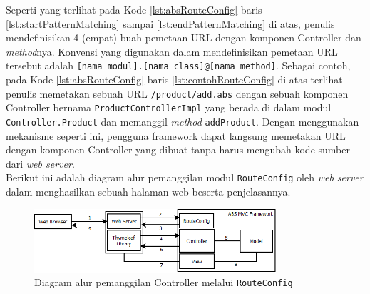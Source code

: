 Seperti yang terlihat pada Kode \ref{lst:absRouteConfig} baris \ref{lst:startPatternMatching} sampai \ref{lst:endPatternMatching} di atas, penulis mendefinisikan 4 (empat) buah pemetaan URL dengan komponen Controller dan \textit{method}nya. Konvensi yang digunakan dalam mendefinisikan pemetaan URL tersebut adalah \texttt{[nama modul].[nama class]@[nama method]}. Sebagai contoh, pada Kode \ref{lst:absRouteConfig} baris \ref{lst:contohRouteConfig} di atas terlihat penulis memetakan sebuah URL \texttt{/product/add.abs} dengan sebuah komponen Controller bernama \texttt{ProductControllerImpl} yang berada di dalam modul \texttt{Controller.Product} dan memanggil \textit{method} \texttt{addProduct}. Dengan menggunakan mekanisme seperti ini, pengguna framework dapat langsung memetakan URL dengan komponen Controller yang dibuat tanpa harus mengubah kode sumber dari \textit{web server}.\\

Berikut ini adalah diagram alur pemanggilan modul \texttt{RouteConfig} oleh \textit{web server} dalam menghasilkan sebuah halaman web beserta penjelasannya.

\begin{figure}
    \centering
    \includegraphics[width=0.8\textwidth]{img/absmvc_flow.png}
    \caption{Diagram alur pemanggilan Controller melalui \texttt{RouteConfig}}
    \label{fig:diagramABSMVCRouteConfig}
\end{figure}

